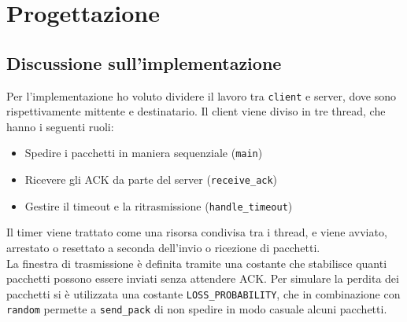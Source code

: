 \documentclass[a4paper,12pt]{report}
\begin{document}
\chapter{Progettazione}

\section{Discussione sull'implementazione}
Per l'implementazione ho voluto dividere il lavoro tra \texttt{client} e server,
dove sono rispettivamente mittente e destinatario. Il client viene diviso in tre thread,
che hanno i seguenti ruoli:
\begin{itemize}
  \item Spedire i pacchetti in maniera sequenziale (\texttt{main})
  \item Ricevere gli ACK da parte del server (\texttt{receive\_ack})
  \item Gestire il timeout e la ritrasmissione (\texttt{handle\_timeout})
\end{itemize}
Il timer viene trattato come una risorsa condivisa tra i thread, e viene avviato, arrestato o resettato a seconda dell'invio o ricezione di pacchetti.\\
La finestra di trasmissione è definita tramite una costante che stabilisce quanti pacchetti possono essere inviati senza attendere ACK.
Per simulare la perdita dei pacchetti si è utilizzata una costante
\texttt{LOSS\_PROBABILITY}, che in combinazione con \texttt{random}
permette a \texttt{send\_pack} di non spedire in modo casuale alcuni pacchetti.\\
\end{document}
